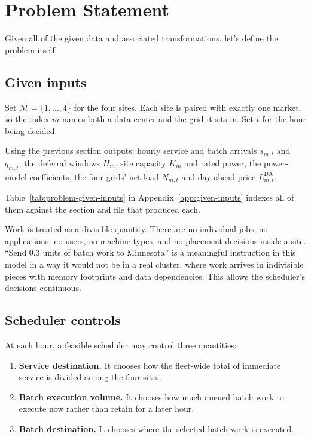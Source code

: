 \documentclass[12pt]{article}
\begin{document}
\section{Problem Statement}
\label{sec:problem-statement}

Given all of the given data and associated transformations, let's define the problem itself.

\subsection{Given inputs}
\label{subsec:problem-given-inputs}

Set \(\mathcal{M}=\{1,\ldots,4\}\) for the four sites. Each site is paired
with exactly one market, so the index \(m\) names both a data center and the
grid it sits in. Set \(t\) for the hour being decided.

Using the previous section outputs: hourly service and batch arrivals \(s_{m,t}\) and \(q_{m,t}\), the deferral windows \(H_m\), site capacity \(K_m\) and rated power, the power-model coefficients, the four grids' net load \(N_{m,t}\) and day-ahead price \(L^{\mathrm{DA}}_{m,t}\).

Table~\ref{tab:problem-given-inputs} in Appendix~\ref{app:given-inputs} indexes all of them against the section and file that produced each.

Work is treated as a divisible quantity. There are no individual jobs, no applications, no users, no machine types, and no placement decisions inside a site. ``Send 0.3 units of batch work to Minnesota'' is a meaningful instruction in this model in a way it would not be in a real cluster, where work arrives in indivisible pieces with memory footprints and data dependencies. This allows  the scheduler's decisions continuous.

\subsection{Scheduler controls}
\label{subsec:problem-decisions}

At each hour, a feasible scheduler may control three quantities:
\begin{enumerate}
  \item \textbf{Service destination.} It chooses how the fleet-wide total of
        immediate service is divided among the four sites.
  \item \textbf{Batch execution volume.} It chooses how much queued batch work
        to execute now rather than retain for a later hour.
  \item \textbf{Batch destination.} It chooses where the selected batch work is
        executed.
\end{enumerate}
\end{document}
